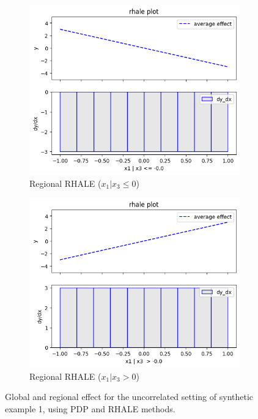 \documentclass[
twocolumn,
]{ceurart}
\begin{document}
\begin{figure}[t]
\begin{subfigure}[b]{0.33\textwidth}
        \label{subfig:a}
    \end{subfigure}
    \begin{subfigure}[b]{0.33\textwidth}
        \centering
        \includegraphics[width=\textwidth]{figures/simulation_1/uncor_regional_rhale_1.png}
        \caption{Regional RHALE ($x_1 | x_3 \leq 0$)}
        \label{subfig:b}
    \end{subfigure}
    \begin{subfigure}[b]{0.33\textwidth}
        \centering
        \includegraphics[width=\textwidth]{figures/simulation_1/uncor_regional_rhale_2.png}
        \caption{Regional RHALE ($x_1 | x_3 > 0$)}
        \label{subfig:b}
    \end{subfigure}
    \caption{Global and regional effect for the uncorrelated setting of synthetic example 1, using PDP and RHALE methods.}
    \label{fig:synthetic-1-uncorrelated}
  \end{figure}
\end{document}
